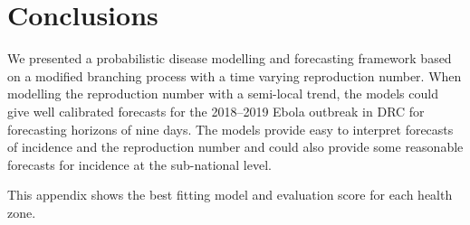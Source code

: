 \documentclass[12pt]{article}
\begin{document}









\section{Conclusions}
We presented a probabilistic disease modelling and forecasting framework based on a modified branching process with a time varying reproduction number. When modelling the reproduction number with a semi-local trend, the models could give well calibrated forecasts for the 2018--2019 Ebola outbreak in DRC for forecasting horizons of nine days. The models provide easy to interpret forecasts of incidence and the reproduction number and could also provide some reasonable forecasts for incidence at the sub-national level.


\newpage

 


\clearpage
\newpage

\appendix
\appendixpage
\addappheadtotoc
{}
This appendix shows the best fitting model and evaluation score for each health zone.


\end{document}

